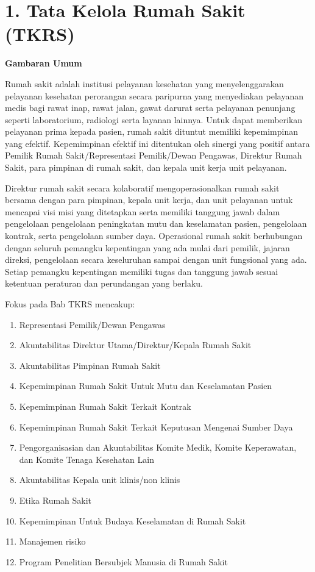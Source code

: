 \documentclass[
]{book}
\providecommand{\tightlist}{%
  \setlength{\itemsep}{0pt}\setlength{\parskip}{0pt}}
\begin{document}
\hypertarget{tata-kelola-rumah-sakit-tkrs}{%
\section*{1. Tata Kelola Rumah Sakit (TKRS)}\label{tata-kelola-rumah-sakit-tkrs}}

\textbf{Gambaran Umum}

Rumah sakit adalah institusi pelayanan kesehatan yang menyelenggarakan pelayanan kesehatan perorangan secara paripurna yang menyediakan pelayanan medis bagi rawat inap, rawat jalan, gawat darurat serta pelayanan penunjang seperti laboratorium, radiologi serta layanan lainnya. Untuk dapat memberikan pelayanan prima kepada pasien, rumah sakit dituntut memiliki kepemimpinan yang efektif. Kepemimpinan efektif ini ditentukan oleh sinergi yang positif antara Pemilik Rumah Sakit/Representasi Pemilik/Dewan Pengawas, Direktur Rumah Sakit, para pimpinan di rumah sakit, dan kepala unit kerja unit pelayanan.

Direktur rumah sakit secara kolaboratif mengoperasionalkan rumah sakit bersama dengan para pimpinan, kepala unit kerja, dan unit pelayanan untuk mencapai visi misi yang ditetapkan serta memiliki tanggung jawab dalam pengelolaan pengelolaan peningkatan mutu dan keselamatan pasien, pengelolaan kontrak, serta pengelolaan sumber daya. Operasional rumah sakit berhubungan dengan seluruh pemangku kepentingan yang ada mulai dari pemilik, jajaran direksi, pengelolaan secara keseluruhan sampai dengan unit fungsional yang ada. Setiap pemangku kepentingan memiliki tugas dan tanggung jawab sesuai ketentuan peraturan dan perundangan yang berlaku.

Fokus pada Bab TKRS mencakup:

\begin{enumerate}
\def\labelenumi{\alph{enumi}.}
\tightlist
\item
  Representasi Pemilik/Dewan Pengawas
\item
  Akuntabilitas Direktur Utama/Direktur/Kepala Rumah Sakit
\item
  Akuntabilitas Pimpinan Rumah Sakit
\item
  Kepemimpinan Rumah Sakit Untuk Mutu dan Keselamatan Pasien
\item
  Kepemimpinan Rumah Sakit Terkait Kontrak
\item
  Kepemimpinan Rumah Sakit Terkait Keputusan Mengenai Sumber Daya
\item
  Pengorganisasian dan Akuntabilitas Komite Medik, Komite Keperawatan, dan Komite Tenaga Kesehatan Lain
\item
  Akuntabilitas Kepala unit klinis/non klinis
\item
  Etika Rumah Sakit
\item
  Kepemimpinan Untuk Budaya Keselamatan di Rumah Sakit
\item
  Manajemen risiko
\item
  Program Penelitian Bersubjek Manusia di Rumah Sakit
\end{enumerate}
\end{document}
